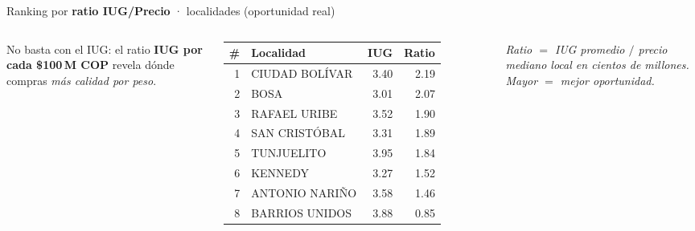 \documentclass[aspectratio=169,11pt]{beamer}
\newcommand{\hi}[1]{\textcolor{inmuGreen}{\textbf{#1}}}
\begin{document}
\begin{frame}{Ranking por \hi{ratio IUG/Precio} · localidades (oportunidad real)}
  \begin{columns}[T,onlytextwidth]
      \scriptsize
      No basta con el IUG: el ratio \hi{IUG por cada \$100\,M COP}
      revela dónde compras \emph{más calidad por peso}.
      \vspace{0.6em}

      \begin{tabular}{rlrr}
        \toprule
        \# & \textbf{Localidad} & \textbf{IUG} & \textbf{Ratio}\\
        \midrule
        1 & CIUDAD BOLÍVAR     & 3.40 & 2.19 \\
        2 & BOSA               & 3.01 & 2.07 \\
        3 & RAFAEL URIBE       & 3.52 & 1.90 \\
        4 & SAN CRISTÓBAL      & 3.31 & 1.89 \\
        5 & TUNJUELITO         & 3.95 & 1.84 \\
        6 & KENNEDY            & 3.27 & 1.52 \\
        7 & ANTONIO NARIÑO     & 3.58 & 1.46 \\
        8 & BARRIOS UNIDOS     & 3.88 & 0.85 \\
        \bottomrule
      \end{tabular}

      \vspace{0.5em}
      {\scriptsize\itshape\color{inmuMuted}
      Ratio $=$ IUG promedio $/$ precio mediano local en cientos
      de millones. Mayor $=$ mejor oportunidad.}


\end{columns}
\end{frame}
\end{document}
